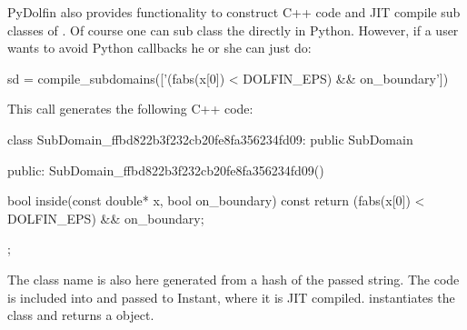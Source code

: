 PyDolfin also provides functionality to construct C++ code and JIT compile sub classes of . Of course one can sub class the  directly in Python. However, if a user wants to avoid Python callbacks he or she can just do:
\begin{python}
sd = compile_subdomains(['(fabs(x[0]) < DOLFIN_EPS) && on_boundary'])
\end{python}
This call generates the following C++ code:
\begin{c++}
class SubDomain_ffbd822b3f232cb20fe8fa356234fd09: public SubDomain
{
public:
  SubDomain_ffbd822b3f232cb20fe8fa356234fd09(){}

  bool inside(const double* x, bool on_boundary) const{
      return (fabs(x[0]) < DOLFIN_EPS) && on_boundary;
  }
};
\end{c++}
The class name is also here generated from a hash of the passed string. The code is included into  and passed to Instant, where it is JIT compiled.  instantiates the class and returns a  object.\par

%
%
%


